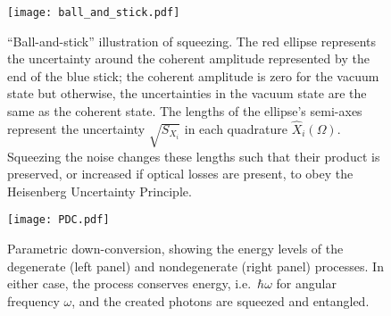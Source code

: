 \begin{figure}
	\centering
	\texttt{[image: ball\_and\_stick.pdf]}
	\caption{``Ball-and-stick'' illustration of squeezing. The red ellipse represents the uncertainty around the coherent amplitude represented by the end of the blue stick; the coherent amplitude is zero for the vacuum state but otherwise, the uncertainties in the vacuum state are the same as the coherent state. The lengths of the ellipse's semi-axes represent the uncertainty $\sqrt{S_{X_i}}$ in each quadrature $\hat X_i(\Omega)$. Squeezing the noise changes these lengths such that their product is preserved, or increased if optical losses are present, to obey the Heisenberg Uncertainty Principle.}
	\label{fig:ballandstick_simple}
\end{figure}
\begin{figure}[ht]
	\centering
	\texttt{[image: PDC.pdf]}
	\caption{Parametric down-conversion, showing the energy levels of the degenerate (left panel) and nondegenerate (right panel) processes. In either case, the process conserves energy, i.e.\ $\hbar\omega$ for angular frequency $\omega$, and the created photons are squeezed and entangled.}
	\label{fig:PDC_deg_and_nondeg}
\end{figure}

